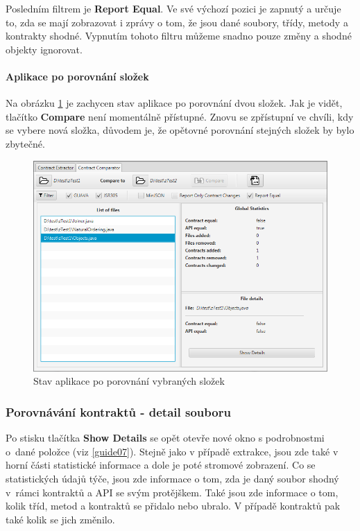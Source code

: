 			Posledním filtrem je \textbf{Report Equal}. Ve své výchozí pozici je zapnutý a určuje to, zda se mají zobrazovat i zprávy o tom, že jsou dané soubory, třídy, metody a kontrakty shodné. Vypnutím tohoto filtru můžeme snadno pouze změny a shodné objekty ignorovat.\\
		
		\paragraph{Aplikace po porovnání složek}	
			Na obrázku \ref{guide08} je zachycen stav aplikace po porovnání dvou složek. Jak je vidět, tlačítko \textbf{Compare} není momentálně přístupné. Znovu se zpřístupní ve chvíli, kdy se vybere nová složka, důvodem je, že opětovné porovnání stejných složek by bylo zbytečné.
			
			\begin{figure}[!htb]
					\centering
					\includegraphics[width=1\textwidth]{img/guide08.png}
					\caption[guide08]{Stav aplikace po porovnání vybraných složek}
					\label{guide08}
				\endminipage\hfill
			\end{figure}			
			
	\subsubsection{Porovnávání kontraktů - detail souboru}
		Po stisku tlačítka \textbf{Show Details} se opět otevře nové okno s podrobnostmi o~dané položce (viz \ref{guide07}). Stejně jako v případě extrakce, jsou zde také v horní části statistické informace a dole je poté stromové zobrazení. Co se statistických údajů týče, jsou zde informace o tom, zda je daný soubor shodný v~rámci kontraktů a API se svým protějškem. Také jsou zde informace o tom, kolik tříd, metod a kontraktů se přidalo nebo ubralo. V případě kontraktů pak také kolik se jich změnilo.\\
		

